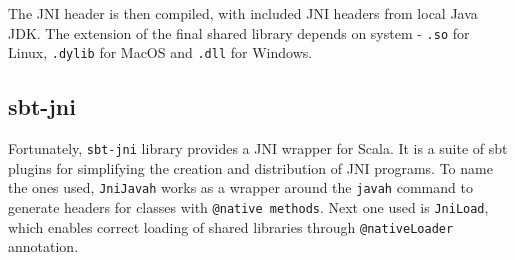The JNI header is then compiled, with included JNI headers from local Java JDK. The extension of the final shared library depends on system - \texttt{.so} for Linux, \texttt{.dylib} for MacOS and \texttt{.dll} for Windows.


\subsection{sbt-jni}
Fortunately, \texttt{sbt-jni} library provides a JNI wrapper for Scala. It is a suite of sbt plugins for simplifying the creation and distribution of JNI programs. To name the ones used, \texttt{JniJavah} works as a wrapper around the \texttt{javah} command to generate headers for classes with \texttt{@native methods}. Next one used is \texttt{JniLoad}, which enables correct loading of shared libraries through \texttt{@nativeLoader} annotation.

